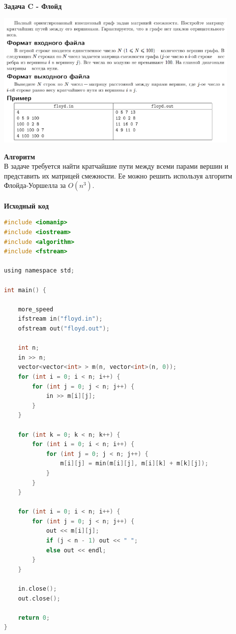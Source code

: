 \documentclass[a4paper,12pt]{article}
\begin{document}
\newpage
\textbf{{\large Задача C - Флойд}} \\
\begin{center}
\includegraphics[width=0.9\textwidth]{SPBGU_GRAPHS/SPBGU_GRAPHS_C.png}\\ [1cm]
\end{center}
\textbf{{\large Алгоритм}} \\
В задаче требуется найти кратчайшие пути между всеми парами вершин и представить их матрицей смежности. Ее можно решить используя алгоритм Флойда-Уоршелла за $O(n^3)$. \\ 
\\
\newpage
\textbf{{\large Исходный код}}
\begin{lstlisting}[language=C]
#include <iomanip>
#include <iostream>
#include <algorithm>
#include <fstream>

using namespace std;

int main() {
    
    more_speed
    ifstream in("floyd.in");
    ofstream out("floyd.out");
    
    int n;
    in >> n;
    vector<vector<int> > m(n, vector<int>(n, 0));
    for (int i = 0; i < n; i++) {
        for (int j = 0; j < n; j++) {
            in >> m[i][j];
        }
    }
    
    for (int k = 0; k < n; k++) {
        for (int i = 0; i < n; i++) {
            for (int j = 0; j < n; j++) {
                m[i][j] = min(m[i][j], m[i][k] + m[k][j]);
            }
        }
    }
    
    for (int i = 0; i < n; i++) {
        for (int j = 0; j < n; j++) {
            out << m[i][j];
            if (j < n - 1) out << " ";
            else out << endl;
        }
    }

    in.close();
    out.close();
    
    return 0;
}
\end{lstlisting}
\end{document}
